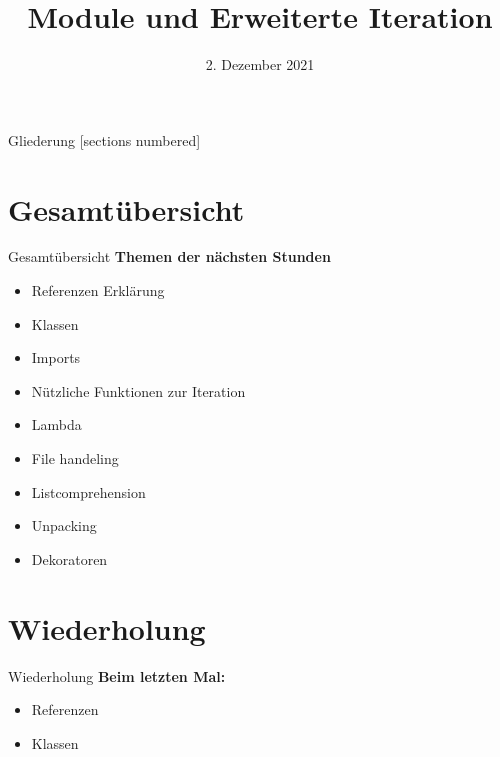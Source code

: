 



\title{Module und Erweiterte Iteration}
\date{2. Dezember 2021}


	
\maketitle

\begin{frame}{Gliederung}
	[sections numbered]
	\tableofcontents
\end{frame}

\section*{Gesamtübersicht}
\begin{frame}{Gesamtübersicht}
	\textbf{Themen der nächsten Stunden}
	\begin{itemize}
		\item Referenzen Erklärung
		\item  Klassen
		\item \alert{Imports}
		\item \alert{Nützliche Funktionen zur Iteration}
		\item Lambda
		\item File handeling
		\item Listcomprehension
		\item Unpacking
		\item Dekoratoren
	\end{itemize}
\end{frame}

\section{Wiederholung}
\begin{frame}{Wiederholung}
	\textbf{Beim letzten Mal:}
	\centering\begin{itemize}
		\item Referenzen
		\item Klassen 
		
	\end{itemize}

		
\end{frame}

